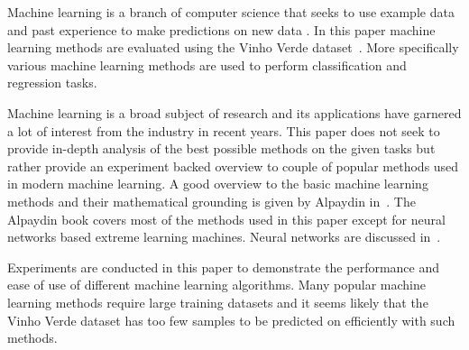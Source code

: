 Machine learning is a branch of computer science that seeks to use example data and past experience to make predictions on new data \cite{alpaydin:2004:introduction}. In this paper machine learning methods are evaluated using the Vinho Verde dataset~\cite{cortez:2009:modeling}. More specifically various machine learning methods are used to perform classification and regression tasks. 

Machine learning is a broad subject of research and its applications have garnered a lot of interest from the industry in recent years. This paper does not seek to provide in-depth analysis of the best possible methods on the given tasks but rather provide an experiment backed overview to couple of popular methods used in modern machine learning. A good overview to the basic machine learning methods and their mathematical grounding is given by Alpaydin in~\cite{alpaydin:2004:introduction}. The Alpaydin book covers most of the methods used in this paper except for neural networks based extreme learning machines. Neural networks are discussed in~\cite{haykin:2009:neural-networks}.

Experiments are conducted in this paper to demonstrate the performance and ease of use of different machine learning algorithms. Many popular machine learning methods require large training datasets and it seems likely that the Vinho Verde dataset has too few samples to be predicted on efficiently with such methods.

